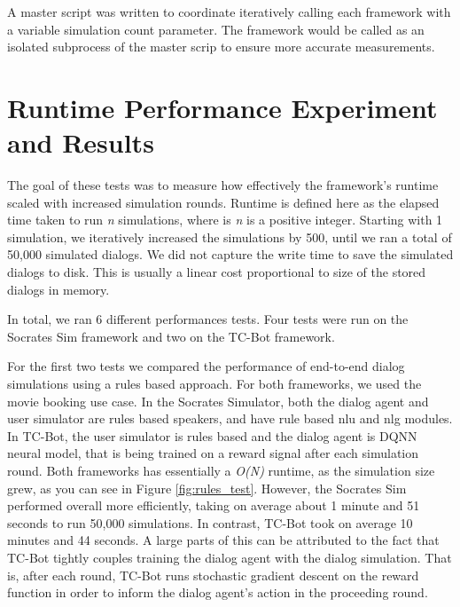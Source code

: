A master script was written to coordinate iteratively calling each framework with a variable simulation count parameter. The framework would be called as an isolated subprocess of the master scrip to ensure more accurate measurements. 

\section{Runtime Performance Experiment and Results}

The goal of these tests was to measure how effectively the framework's runtime scaled with increased simulation rounds. Runtime is defined here as the elapsed time taken to run \textit{n} simulations, where is \textit{n} is a positive integer. Starting with 1 simulation, we iteratively increased the simulations by 500, until we ran a total of 50,000 simulated dialogs. We did not capture the write time to save the simulated dialogs to disk. This is usually a linear cost proportional to size of the stored dialogs in memory. 

In total, we ran 6 different performances tests. Four tests were run on the Socrates Sim framework and two on the TC-Bot framework. 

For the first two tests we compared the performance of end-to-end dialog simulations using a rules based approach. For both frameworks, we used the movie booking use case. In the Socrates Simulator, both the dialog agent and user simulator are rules based speakers, and have rule based nlu and nlg modules. In TC-Bot, the user simulator is rules based and the dialog agent is DQNN neural model, that is being trained on a reward signal after each simulation round.  Both frameworks has essentially a \textit{O(N)} runtime, as the simulation size grew, as you can see in Figure \ref{fig:rules_test}. However, the Socrates Sim performed overall more efficiently, taking on average about 1 minute and 51 seconds to run 50,000 simulations. In contrast, TC-Bot took on average 10 minutes and 44 seconds. A large parts of this can be attributed to the fact that TC-Bot tightly couples training the dialog agent with the dialog simulation. That is, after each round, TC-Bot runs stochastic gradient descent on the reward function in order to inform the dialog agent's action in the proceeding round. 


